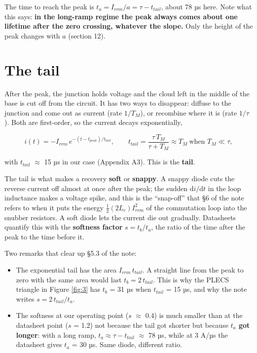 \documentclass[11pt,a4paper,numbers=noenddot]{scrartcl}
\providecommand{\tightlist}{\setlength{\itemsep}{0pt}\setlength{\parskip}{0pt}}
\begin{document}
\begin{onehalfspace}
The time to reach the peak is \(t_a = I_{rrm}/a = \tau - t_{tail}\), about 78 µs here. Note what this says: \textbf{in the long-ramp regime the peak always comes about one lifetime after the zero crossing, whatever the slope.} Only the height of the peak changes with \(a\) (section 12).

\section{The tail}\label{the-tail}

After the peak, the junction holds voltage and the cloud left in the middle of the base is cut off from the circuit. It has two ways to disappear: diffuse to the junction and come out as current (rate \(1/T_M\)), or recombine where it is (rate \(1/\tau\)). Both are first-order, so the current decays exponentially,

\[i(t) = -I_{rrm}\, e^{-(t - t_{peak})/t_{tail}}, \qquad t_{tail} = \frac{\tau\,T_M}{\tau + T_M} \approx T_M \ \text{when } T_M \ll \tau,\]

with \(t_{tail}\) \(\approx\) 15 µs in our case (Appendix A3). This is the \textbf{tail}.

The tail is what makes a recovery \textbf{soft} or \textbf{snappy}. A snappy diode cuts the reverse current off almost at once after the peak; the sudden \(\mathrm{d}i/\mathrm{d}t\) in the loop inductance makes a voltage spike, and this is the ``snap-off'' that \S6 of the note refers to when it puts the energy \(\tfrac{1}{2}(2L_c)I_{rrm}^2\) of the commutation loop into the snubber resistors. A soft diode lets the current die out gradually. Datasheets quantify this with the \textbf{softness factor} \(s = t_b/t_a\), the ratio of the time after the peak to the time before it.

Two remarks that clear up \S5.3 of the note:

\begin{itemize}
\tightlist
\item
  The exponential tail has the area \(I_{rrm}\, t_{tail}\). A straight line from the peak to zero with the same area would last \(t_b = 2\,t_{tail}\). This is why the PLECS triangle in Figure \ref{fig:3} has \(t_b\) = 31 µs when \(t_{tail}\) = 15 µs, and why the note writes \(s = 2\,t_{tail}/t_a\).
\item
  The softness at our operating point (\(s\) \(\approx\) 0.4) is much smaller than at the datasheet point (\(s\) = 1.2) not because the tail got shorter but because \textbf{\(t_a\) got longer}: with a long ramp, \(t_a \approx \tau - t_{tail}\) \(\approx\) 78 µs, while at 3 A/µs the datasheet gives \(t_a\) = 30 µs. Same diode, different ratio.
\end{itemize}


\end{onehalfspace}
\end{document}

